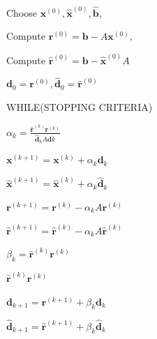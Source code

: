 \documentclass[11pt]{book}
\begin{document}
Choose $\mathbf{x}^{(0)}, \hat{\mathbf{x}}^{(0)}, \hat{\mathbf{b}}$,

Compute $\mathbf{r}^{(0)}=\mathbf{b}-A \mathbf{x}^{(0)}$,

Compute $\hat{\mathbf{r}}^{(0)}=\mathbf{b}-\hat{\mathbf{x}}^{(0)} A$

$\mathbf{d}_{0}=\mathbf{r}^{(0)}, \hat{\mathbf{d}}_{0}=\hat{\mathbf{r}}^{(0)}$

WHILE(STOPPING CRITERIA)

$\alpha_{k}=\frac{\hat{\mathbf{r}}^{(k)} \mathbf{r}^{(k)}}{\hat{\mathbf{d}}_{k} A \mathbf{d} k}$

$\mathbf{x}^{(k+1)}=\mathbf{x}^{(k)}+\alpha_{k} \mathbf{d}_{k}$

$\hat{\mathbf{x}}^{(k+1)}=\hat{\mathbf{x}}^{(k)}+\alpha_{k} \hat{\mathbf{d}}_{k}$

$\mathbf{r}^{(k+1)}=\mathbf{r}^{(k)}-\alpha_{k} A \mathbf{r}^{(k)} $

$\hat{\mathbf{r}}^{(k+1)}=\hat{\mathbf{r}}^{(k)}-\alpha_{k} A \hat{\mathbf{r}}^{(k)}$ 

$ \beta_{k}= \hat{\mathbf{r}}^{(k)} \mathbf{r}^{(k)} $

$ \hat{\mathbf{r}}^{(k)} \mathbf{r}^{(k)} $

$ \mathbf{d}_{k+1}=\mathbf{r}^{(k+1)}+\beta_{k} \mathbf{d}_{k} $

$ \hat{\mathbf{d}}_{k+1}=\hat{\mathbf{r}}^{(k+1)}+\beta_{k} \hat{\mathbf{d}}_{k} $
\end{document}
